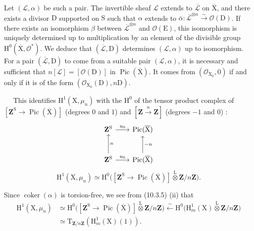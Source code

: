 \documentclass[11pt,leqno]{article}
\newcommand{\Page}[1]{\ifvmode\noindent\else\unskip\ \fi{\footnotesize\textcolor{gray}{[p.\,#1]}}\ \ignorespaces}
\begin{document}
Let \((\mathcal{L},\alpha)\) be such a pair. The invertible sheaf \(\mathcal{L}\) extends to \(\overline{\mathcal{L}}\) on \(\overline{\mathrm{X}}\), and there exists a divisor \(\mathrm{D}\) supported on \(\mathrm{S}\) such that \(\alpha\) extends to \(\bar\alpha:\overline{\mathcal{L}}^{\otimes n}\xrightarrow{\sim}\mathcal{O}(\mathrm{D})\). If there exists an isomorphism \(\beta\) between \(\overline{\mathcal{L}}^{\otimes n}\) and \(\mathcal{O}(\mathrm{E})\), this isomorphism is uniquely determined up to multiplication by an element of the divisible group \(\mathrm{H}^{0}(\overline{\mathrm{X}},\mathcal{O}^{*})\). We deduce that \((\overline{\mathcal{L}},\mathrm{D})\) determines \((\mathcal{L},\alpha)\) up to isomorphism. For a pair \((\overline{\mathcal{L}},\mathrm{D})\) to come from a suitable pair \((\mathcal{L},\alpha)\), it is necessary and sufficient that \(n[\mathcal{L}]=[\mathcal{O}(\mathrm{D})]\) in \(\operatorname{Pic}(\overline{\mathrm{X}})\). It comes from \((\mathcal{O}_{\mathrm{X}_0},0)\) if and only if it is of the form \((\mathcal{O}_{\mathrm{X}_0}(\mathrm{D}),n\mathrm{D})\).

\Page{71}
This identifies \(\mathrm{H}^{1}(\mathrm{X},\mu_n)\) with the \(\mathrm{H}^{0}\) of the tensor product complex of \([\mathbf{Z}^{\mathrm{S}}\to\operatorname{Pic}(\overline{\mathrm{X}})]\) (degrees \(0\) and \(1\)) and \([\mathbf{Z}\xrightarrow{n}\mathbf{Z}]\) (degrees \(-1\) and \(0\)) :
\[
\begin{tikzcd}[column sep=2em,row sep=2.5em]
\mathbf{Z}^{\mathrm{S}} \arrow[r,"u_0"]
 & \operatorname{Pic}(\overline{\mathrm{X}})\\
\mathbf{Z}^{\mathrm{S}} \arrow[r,"u_0"] \arrow[u,"n"']
 & \operatorname{Pic}(\overline{\mathrm{X}}) \arrow[u,"-n"']
\end{tikzcd}
\]
\[
\mathrm{H}^{1}(\mathrm{X},\mu_n)
\simeq
\mathrm{H}^{0}\bigl(
[\mathbf{Z}^{\mathrm{S}}\to\operatorname{Pic}(\overline{\mathrm{X}})]
\overset{\mathrm{L}}{\otimes}\mathbf{Z}/n\mathbf{Z}\bigr).
\]

Since \(\operatorname{coker}(\alpha)\) is torsion-free, we see from (10.3.5) (ii) that
\[
\begin{aligned}
\mathrm{H}^{1}(\mathrm{X},\mu_n)
&\simeq
\mathrm{H}^{0}\bigl(
[\mathbf{Z}^{\mathrm{S}}\to\operatorname{Pic}(\overline{\mathrm{X}})]
\overset{\mathrm{L}}{\otimes}\mathbf{Z}/n\mathbf{Z}\bigr)
\xleftarrow{\sim}
\mathrm{H}^{0}\bigl(
\mathrm{H}^{1}_{m}(\mathrm{X})
\overset{\mathrm{L}}{\otimes}\mathbf{Z}/n\mathbf{Z}\bigr)\\
&\simeq
\mathrm{T}_{\mathbf{Z}/n\mathbf{Z}}(\mathrm{H}^{1}_{m}(\mathrm{X})(1)).
\end{aligned}
\]
\end{document}
